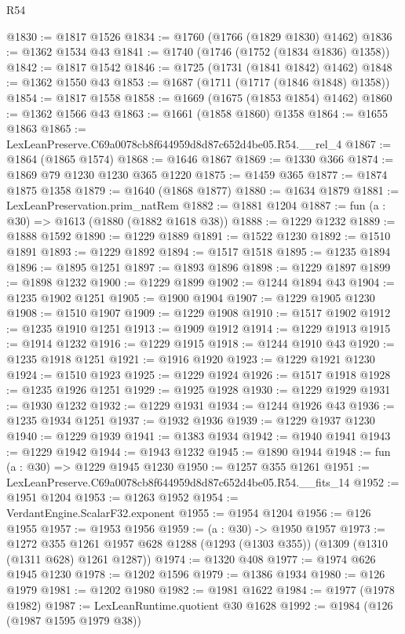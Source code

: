 \begin{lexlean}{R54}
\begin{coremodule}
@1830 := @1817 @1526
@1834 := @1760 (@1766 (@1829 @1830) @1462)
@1836 := @1362 @1534 @43
@1841 := @1740 (@1746 (@1752 (@1834 @1836) @1358))
@1842 := @1817 @1542
@1846 := @1725 (@1731 (@1841 @1842) @1462)
@1848 := @1362 @1550 @43
@1853 := @1687 (@1711 (@1717 (@1846 @1848) @1358))
@1854 := @1817 @1558
@1858 := @1669 (@1675 (@1853 @1854) @1462)
@1860 := @1362 @1566 @43
@1863 := @1661 (@1858 @1860) @1358
@1864 := @1655 @1863
@1865 := LexLeanPreserve.C69a0078cb8f644959d8d87c652d4be05.R54.__rel_4
@1867 := @1864 (@1865 @1574)
@1868 := @1646 @1867
@1869 := @1330 @366
@1874 := @1869 @79 @1230 @1230 @365 @1220
@1875 := @1459 @365
@1877 := @1874 @1875 @1358
@1879 := @1640 (@1868 @1877)
@1880 := @1634 @1879
@1881 := LexLeanPreservation.prim_natRem
@1882 := @1881 @1204
@1887 := fun (a : @30) => @1613 (@1880 (@1882 @1618 @38))
@1888 := @1229 @1232
@1889 := @1888 @1592
@1890 := @1229 @1889
@1891 := @1522 @1230
@1892 := @1510 @1891
@1893 := @1229 @1892
@1894 := @1517 @1518
@1895 := @1235 @1894
@1896 := @1895 @1251
@1897 := @1893 @1896
@1898 := @1229 @1897
@1899 := @1898 @1232
@1900 := @1229 @1899
@1902 := @1244 @1894 @43
@1904 := @1235 @1902 @1251
@1905 := @1900 @1904
@1907 := @1229 @1905 @1230
@1908 := @1510 @1907
@1909 := @1229 @1908
@1910 := @1517 @1902
@1912 := @1235 @1910 @1251
@1913 := @1909 @1912
@1914 := @1229 @1913
@1915 := @1914 @1232
@1916 := @1229 @1915
@1918 := @1244 @1910 @43
@1920 := @1235 @1918 @1251
@1921 := @1916 @1920
@1923 := @1229 @1921 @1230
@1924 := @1510 @1923
@1925 := @1229 @1924
@1926 := @1517 @1918
@1928 := @1235 @1926 @1251
@1929 := @1925 @1928
@1930 := @1229 @1929
@1931 := @1930 @1232
@1932 := @1229 @1931
@1934 := @1244 @1926 @43
@1936 := @1235 @1934 @1251
@1937 := @1932 @1936
@1939 := @1229 @1937 @1230
@1940 := @1229 @1939
@1941 := @1383 @1934
@1942 := @1940 @1941
@1943 := @1229 @1942
@1944 := @1943 @1232
@1945 := @1890 @1944
@1948 := fun (a : @30) => @1229 @1945 @1230
@1950 := @1257 @355 @1261
@1951 := LexLeanPreserve.C69a0078cb8f644959d8d87c652d4be05.R54.__fits_14
@1952 := @1951 @1204
@1953 := @1263 @1952
@1954 := VerdantEngine.ScalarF32.exponent
@1955 := @1954 @1204
@1956 := @126 @1955
@1957 := @1953 @1956
@1959 := (a : @30) -> @1950 @1957
@1973 := @1272
    @355
    @1261
    @1957
    @628
    @1288
    (@1293 (@1303 @355))
    (@1309 (@1310 (@1311 @628) @1261 @1287))
@1974 := @1320 @408
@1977 := @1974 @626 @1945 @1230
@1978 := @1202 @1596
@1979 := @1386 @1934
@1980 := @126 @1979
@1981 := @1202 @1980
@1982 := @1981 @1622
@1984 := @1977 (@1978 @1982)
@1987 := LexLeanRuntime.quotient @30 @1628
@1992 := @1984 (@126 (@1987 @1595 @1979 @38))

\end{coremodule}
\end{lexlean}
